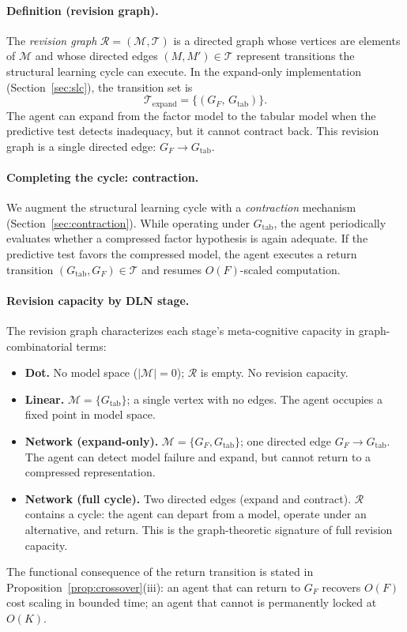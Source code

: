 \documentclass[11pt]{article}
\begin{document}
\paragraph{Definition (revision graph).}
The \emph{revision graph} $\mathcal{R} = (\mathcal{M}, \mathcal{T})$ is a
directed graph whose vertices are elements of $\mathcal{M}$ and whose directed
edges $(M, M') \in \mathcal{T}$ represent transitions the structural learning
cycle can execute.
In the expand-only implementation (Section~\ref{sec:slc}), the transition set is
\[
\mathcal{T}_{\text{expand}} = \bigl\{(G_F,\, G_{\mathrm{tab}})\bigr\}.
\]
The agent can expand from the factor model to the tabular model when the
predictive test detects inadequacy, but it cannot contract back.  This revision
graph is a single directed edge: $G_F \to G_{\mathrm{tab}}$.

\paragraph{Completing the cycle: contraction.}
We augment the structural learning cycle with a \emph{contraction} mechanism
(Section~\ref{sec:contraction}).  While operating under $G_{\mathrm{tab}}$, the
agent periodically evaluates whether a compressed factor hypothesis is again
adequate.  If the predictive test favors the compressed model, the agent
executes a return transition $(G_{\mathrm{tab}}, G_F)\in\mathcal{T}$ and resumes
$O(F)$-scaled computation.

\paragraph{Revision capacity by DLN stage.}
The revision graph characterizes each stage's meta-cognitive capacity in
graph-combinatorial terms:
\begin{itemize}[leftmargin=*]
\item \textbf{Dot.}  No model space ($|\mathcal{M}|=0$); $\mathcal{R}$ is empty.
  No revision capacity.
\item \textbf{Linear.}  $\mathcal{M} = \{G_{\mathrm{tab}}\}$; a single vertex
  with no edges.  The agent occupies a fixed point in model space.
\item \textbf{Network (expand-only).}  $\mathcal{M} = \{G_F, G_{\mathrm{tab}}\}$;
  one directed edge $G_F \to G_{\mathrm{tab}}$.  The agent can detect model
  failure and expand, but cannot return to a compressed representation.
\item \textbf{Network (full cycle).}  Two directed edges (expand and contract).
  $\mathcal{R}$ contains a cycle: the agent can depart from a model, operate
  under an alternative, and return.  This is the graph-theoretic signature of
  full revision capacity.
\end{itemize}
The functional consequence of the return transition is stated in
Proposition~\ref{prop:crossover}(iii): an agent that can return to $G_F$ recovers
$O(F)$ cost scaling in bounded time; an agent that cannot is permanently locked
at $O(K)$.
\end{document}

